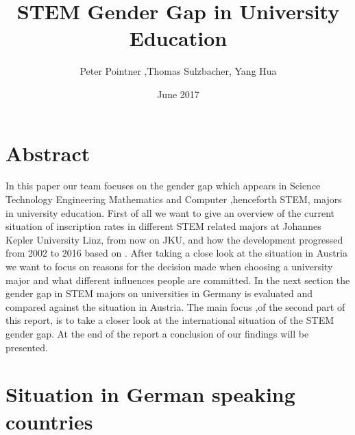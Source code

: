 \documentclass[12pt]{article}
\title{STEM Gender Gap in University Education}
\date{June 2017}
\author{Peter Pointner ,Thomas Sulzbacher, Yang Hua}
\begin{document}
	\maketitle
	\newpage
	
	\tableofcontents
	\newpage
	\section{Abstract}
In this paper our team focuses on the gender gap which appears in Science Technology Engineering Mathematics and Computer ,henceforth STEM, majors in university education. First of all we want to give an overview of the current situation of inscription rates in different STEM related majors at Johannes Kepler University Linz, from now on  JKU, and how the development progressed from 2002 to 2016 based on \cite{studienwahl_jku} \cite{eq_1} \cite{eq_2} \cite{eq_3}. After taking a close look at the situation in Austria we want to focus on reasons for the decision made when choosing a university major and what different influences people are committed.
In the next section the gender gap in STEM majors on universities in Germany is evaluated and compared against the situation in Austria. The main focus ,of the second part of this report, is to take a closer look at the international situation of the STEM gender gap. At the end of the report a conclusion of our findings will be presented.    
 	\section{Situation in German speaking countries}
\end{document}
